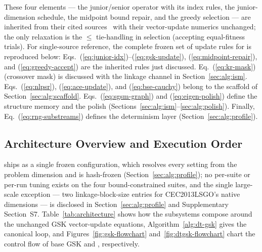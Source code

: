These four elements --- the junior/senior operator with its index
rules, the junior-dimension schedule, the midpoint bound repair, and
the greedy selection --- are inherited from their cited
sources~\cite{mohamed2020gaining,tanabe2014improving} with their
vector-update numerics unchanged; the only relaxation is the $\le$
tie-handling in selection (accepting equal-fitness trials).
For single-source reference, the complete frozen set of update rules
for \dtgsk{} is reproduced below:
Eqs.~(\ref{eq:junior-idx})--(\ref{eq:gsk-update}),
(\ref{eq:midpoint-repair}), and (\ref{eq:greedy-accept}) are the
inherited rules just discussed.
Eq.~(\ref{eq:kr-mask}) (crossover mask) is discussed with the linkage
channel in Section~\ref{sec:alg:ism}.
Eqs.~(\ref{eq:nlpsr}), (\ref{eq:ace-update}), and
(\ref{eq:bse-cauchy}) belong to the scaffold of
Section~\ref{sec:alg:scaffold}.
Eqs.~(\ref{eq:sgsm-graph}) and (\ref{eq:eigen-polish}) define the
structure memory and the polish
(Sections~\ref{sec:alg:ism}--\ref{sec:alg:polish}). Finally,
Eq.~(\ref{eq:rng-substreams}) defines the determinism layer
(Section~\ref{sec:alg:profile}).



\subsection{Architecture Overview and Execution Order}\label{sec:alg:overview}

\dtgsk{} ships as a single frozen configuration,
which resolves every setting from the problem dimension and is
hash-frozen (Section~\ref{sec:alg:profile}); no per-suite or per-run
tuning exists on the four bound-constrained suites, and the single
large-scale exception --- two linkage-block-size entries for
CEC2013LSGO's native dimensions --- is disclosed in
Section~\ref{sec:alg:profile} and Supplementary Section~S7.
Table~\ref{tab:architecture} shows how the subsystems compose around
the unchanged GSK vector-update equations, Algorithm~\ref{alg:dt-gsk} gives the
canonical loop, and Figures~\ref{fig:gsk-flowchart}
and~\ref{fig:dtgsk-flowchart} chart the control flow of base GSK and
\dtgsk{}, respectively.

